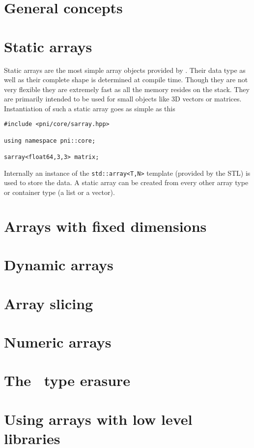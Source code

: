 
\section{General concepts}\label{sec:array:general_concepts}


\section{Static arrays}\label{sec:array:static_arrays}

Static arrays are the most simple array objects provided by \libpnicore. Their
data type as well as their complete shape is determined at compile time. Though
they are not very flexible they are extremely fast as all the memory resides on
the stack. They are primarily intended to be used for small objects like 3D
vectors or matrices. 
Instantiation of such a static array goes as simple as this
\begin{verbatim}
#include <pni/core/sarray.hpp>

using namespace pni::core;

sarray<float64,3,3> matrix;
\end{verbatim}
Internally an instance of the {\tt std::array<T,N>} template (provided by the
STL) is used to store the data. A static array can be created from every other
array type or container type (a list or a vector).

%

\section{Arrays with fixed dimensions}


\section{Dynamic arrays}\label{sec:array:dynamic_arrays}

\section{Array slicing}\label{sec:array:array_slicing}

\section{Numeric arrays}\label{sec:array:numeric_arrays}

\section{The \arrayerasure\ type erasure}\label{sec:array:type_erasure}

\section{Using arrays with low level libraries}
